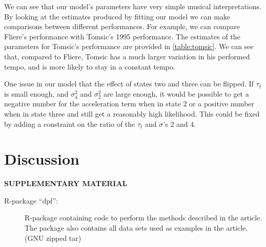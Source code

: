 \documentclass[12pt]{article}
\begin{document}
We can see that our model's parameters have very simple musical interpretations. By looking at the estimates produced by fitting our model we can make comparisons between different performances. For example, we can compare Fliere's performance with Tomsic's 1995 performance. The estimates of the parameters for Tomsic's performance are provided in \autoref{table:tomsic}. We can see that, compared to Fliere, Tomsic has a much larger variation in his performed tempo, and is more likely to stay in a constant tempo.

One issue in our model that the effect of states two and three can be flipped. If $\tau_t$ is small enough, and $\sigma_4^2$ and $\sigma_2^2$ are large enough, it would be possible to get a negative number for the acceleration term when in state 2 or a positive number when in state three and still get a reasonably high likelihood. This could be fixed by adding a constraint on the ratio of the $\tau_t$ and $\sigma$'s 2 and 4.

\section{Discussion}




\bigskip
\begin{center}
{\large\bf SUPPLEMENTARY MATERIAL}
\end{center}

\begin{description}

\item[R-package ``dpf'':] R-package containing code to perform the
  methods described in the article. The package also contains all data
  sets used as examples in the article. (GNU zipped tar)

\end{description}






\end{document}
